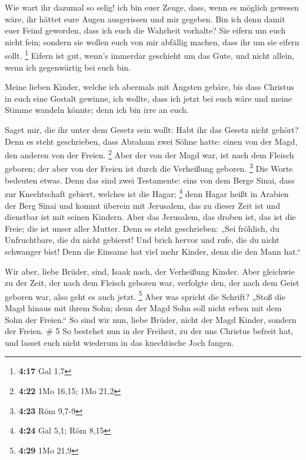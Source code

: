  Wie wart ihr dazumal so selig! ich bin euer Zeuge, dass,
wenn es möglich gewesen wäre, ihr hättet eure Augen ausgerissen und mir
gegeben.  Bin ich denn damit euer Feind geworden, dass
ich euch die Wahrheit vorhalte?  Sie eifern um euch nicht
fein; sondern sie wollen euch von mir abfällig machen, dass ihr um sie
eifern sollt. \footnote{\textbf{4:17} Gal 1,7}  Eifern
ist gut, wenn's immerdar geschieht um das Gute, und nicht allein, wenn
ich gegenwärtig bei euch bin.

 Meine lieben Kinder, welche ich abermals mit Ängsten
gebäre, bis dass Christus in euch eine Gestalt gewinne, 
ich wollte, dass ich jetzt bei euch wäre und meine Stimme wandeln
könnte; denn ich bin irre an euch.

 Saget mir, die ihr unter dem Gesetz sein wollt: Habt ihr
das Gesetz nicht gehört?  Denn es steht geschrieben, dass
Abraham zwei Söhne hatte: einen von der Magd, den anderen von der
Freien. \footnote{\textbf{4:22} 1Mo 16,15; 1Mo 21,2} 
Aber der von der Magd war, ist nach dem Fleisch geboren; der aber von
der Freien ist durch die Verheißung geboren. \footnote{\textbf{4:23} Röm
  9,7-9}  Die Worte bedeuten etwas. Denn das sind zwei
Testamente: eins von dem Berge Sinai, dass zur Knechtschaft gebiert,
welches ist die Hagar; \footnote{\textbf{4:24} Gal 5,1; Röm 8,15}
 denn Hagar heißt in Arabien der Berg Sinai und kommt
überein mit Jerusalem, das zu dieser Zeit ist und dienstbar ist mit
seinen Kindern.  Aber das Jerusalem, das droben ist, das
ist die Freie; die ist unser aller Mutter.  Denn es steht
geschrieben: „Sei fröhlich, du Unfruchtbare, die du nicht gebierst! Und
brich hervor und rufe, die du nicht schwanger bist! Denn die Einsame hat
viel mehr Kinder, denn die den Mann hat.``

 Wir aber, liebe Brüder, sind, Isaak nach, der Verheißung
Kinder.  Aber gleichwie zu der Zeit, der nach dem Fleisch
geboren war, verfolgte den, der nach dem Geist geboren war, also geht es
auch jetzt. \footnote{\textbf{4:29} 1Mo 21,9}  Aber was
spricht die Schrift? „Stoß die Magd hinaus mit ihrem Sohn; denn der Magd
Sohn soll nicht erben mit dem Sohn der Freien.``  So sind
wir nun, liebe Brüder, nicht der Magd Kinder, sondern der Freien. \# 5
 So bestehet nun in der Freiheit, zu der uns Christus
befreit hat, und lasset euch nicht wiederum in das knechtische Joch
fangen.

